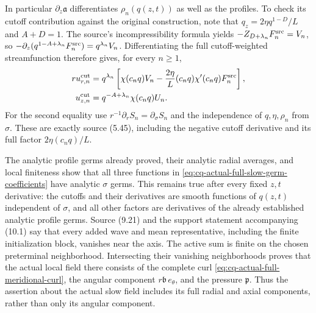In particular $\partial_z\mathfrak a$ differentiates
$\rho_n(q(z,t))$ as well as the profiles. To check its cutoff
contribution against the original construction, note that
$q_z=2\eta q^{1-D}/L$ and $A+D=1$. The source's
incompressibility formula yields
$-Z_{D+\lambda_n}F_n^{\rm src}=V_n$, so
$-\partial_z(q^{1-A+\lambda_n}F_n^{\rm src})
 =q^{\lambda_n}V_n$.
Differentiating the full cutoff-weighted streamfunction therefore
gives, for every $n\geq1$,
\begin{equation}
\begin{aligned}
 r u_{r,n}^{\rm cut}
 &=q^{\lambda_n}\left[
       \chi(c_nq)V_n-
        \frac{2\eta}{L}(c_nq)\chi'(c_nq)F_n^{\rm src}\right],\\
 u_{z,n}^{\rm cut}
 &=q^{-A+\lambda_n}\chi(c_nq)U_n .
\end{aligned}
 \label{eq:cq-actual-exact-streamfunction-cutoff-term}
\end{equation}
For the second equality use
$r^{-1}\partial_r S_n=\partial_\sigma S_n$ and the
independence of $q,\eta,\rho_n$ from $\sigma$.
These are exactly source (5.45), including the negative cutoff
derivative and its full factor $2\eta(c_nq)/L$.

The analytic profile germs already proved, their analytic radial
averages, and local finiteness show that all three functions in
\eqref{eq:cq-actual-full-slow-germ-coefficients} have analytic
$\sigma$ germs. This remains true after every fixed $z,t$
derivative: the cutoffs and their derivatives are smooth functions
of $q(z,t)$ independent of $\sigma$, and all other factors are
derivatives of the already established analytic profile germs.
Source (9.21) and the support statement accompanying (10.1) say
that every added wave and mean representative, including the
finite initialization block, vanishes near the axis. The active
sum is finite on the chosen preterminal neighborhood. Intersecting
their vanishing neighborhoods proves that the actual local field
there consists of the complete curl
\eqref{eq:cq-actual-full-meridional-curl}, the angular component
$r\mathfrak b\,e_\theta$, and the pressure $\mathfrak p$.
Thus the assertion about the actual slow field includes its full
radial and axial components, rather than only its angular component.

